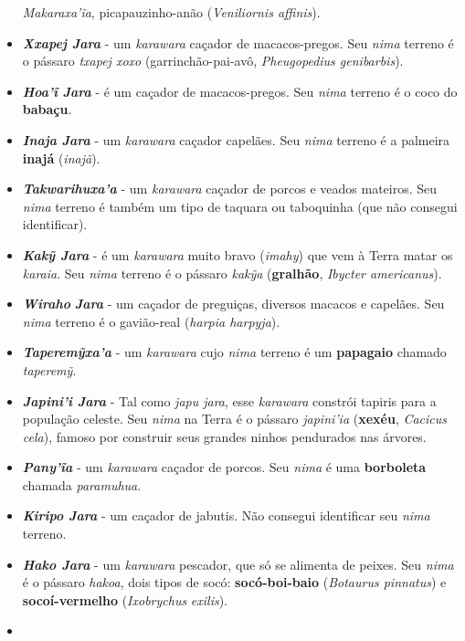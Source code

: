 \begin{itemize}
  \emph{Makaraxa'ĩa}, picapauzinho-anão (\emph{Veniliornis affinis}).
\item
  \emph{\textbf{Xxapej Jara}} - um \emph{karawara} caçador de
  macacos-pregos. Seu \emph{nima} terreno é o pássaro \emph{txapej xoxo}
  (garrinchão-pai-avô, \emph{Pheugopedius genibarbis}).
\item
  \textbf{\emph{Hoa'ĩ} \emph{Jara}} - é um caçador de macacos-pregos.
  Seu \emph{nima} terreno é o coco do \textbf{babaçu}.
\item
  \textbf{\emph{Inaja} \emph{Jara}} - um \emph{karawara} caçador
  capelães. Seu \emph{nima} terreno é a palmeira \textbf{inajá}
  (\emph{inajã}).
\item
  \emph{\textbf{Takwarihuxa'a}} - um \emph{karawara} caçador de porcos e
  veados mateiros. Seu \emph{nima} terreno é também um tipo de taquara
  ou taboquinha (que não consegui identificar).
\item
  \emph{\textbf{Kakỹ Jara}} - é um \emph{karawara} muito bravo
  (\emph{imahy}) que vem à Terra matar os \emph{karaia}. Seu \emph{nima}
  terreno é o pássaro \emph{kakỹa} (\textbf{gralhão}, \emph{Ibycter
  americanus}).
\item
  \emph{\textbf{Wiraho}} \emph{\textbf{Jara}} - um caçador de preguiças,
  diversos macacos e capelães. Seu \emph{nima} terreno é o gavião-real
  (\emph{harpia harpyja}).
\item
  \emph{\textbf{Taperemỹxa'a}} - um \emph{karawara} cujo \emph{nima}
  terreno é um \textbf{papagaio} chamado \emph{taperemỹ}.
\item
  \emph{\textbf{Japini'i Jara}} - Tal como \emph{japu jara}, esse
  \emph{karawara} constrói tapiris para a população celeste. Seu
  \emph{nima} na Terra é o pássaro \emph{japini'ia} (\textbf{xexéu},
  \emph{Cacicus} \emph{cela}), famoso por construir seus grandes ninhos
  pendurados nas árvores.
\item
  \emph{\textbf{Pany'ĩa}} - um \emph{karawara} caçador de porcos. Seu
  \emph{nima} é uma \textbf{borboleta} chamada \emph{paramuhua}.
\item
  \emph{\textbf{Kiripo Jara}} - um caçador de jabutis. Não consegui
  identificar seu \emph{nima} terreno.
\item
  \textbf{\emph{Hako Jara}} - um \emph{karawara} pescador, que só se
  alimenta de peixes. Seu \emph{nima} é o pássaro \emph{hakoa}, dois
  tipos de socó: \textbf{socó-boi-baio} (\emph{Botaurus pinnatus}) e
  \textbf{socoí-vermelho} (\emph{Ixobrychus} \emph{exilis}).
\item

\end{itemize}

